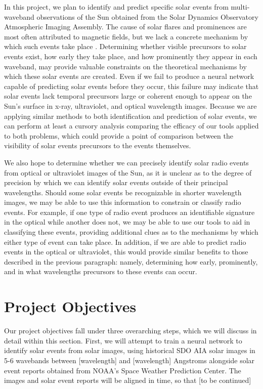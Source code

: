 \documentclass[12pt, letterpaper]{article}
\begin{document}
In this project, we plan to identify and predict specific solar events from multi-waveband observations of the Sun obtained from the Solar Dynamics Observatory Atmospheric Imaging Assembly. The cause of solar flares and prominences are most often attributed to magnetic fields, but we lack a concrete mechanism by which such events take place \cite{BOB}. Determining whether visible precursors to solar events exist, how early they take place, and how prominently they appear in each waveband, may provide valuable constraints on the theoretical mechanisms by which these solar events are created. Even if we fail to produce a neural network capable of predicting solar events before they occur, this failure may indicate that solar events lack temporal precursors large or coherent enough to appear on the Sun’s surface in x-ray, ultraviolet, and optical wavelength images. Because we are applying similar methods to both identification and prediction of solar events, we can perform at least a cursory analysis comparing the efficacy of our tools applied to both problems, which could provide a point of comparison between the visibility of solar events precursors to the events themselves. 

We also hope to determine whether we can precisely identify solar radio events from optical or ultraviolet images of the Sun, as it is unclear as to the degree of precision by which we can identify solar events outside of their principal wavelengths. Should some solar events be recognizable in shorter wavelength images, we may be able to use this information to constrain or classify radio events. For example, if one type of radio event produces an identifiable signature in the optical while another does not, we may be able to use our tools to aid in classifying these events, providing additional clues as to the mechanisms by which either type of event can take place. In addition, if we are able to predict radio events in the optical or ultraviolet, this would provide similar benefits to those described in the previous paragraph: namely, determining how early, prominently, and in what wavelengths precursors to these events can occur. 

\section*{Project Objectives}

Our project objectives fall under three overarching steps, which we will discuss in detail within this section. First, we will attempt to train a neural network to identify solar events from solar images, using historical SDO AIA solar images in 5-6 wavebands between [wavelength] and [wavelength] Angstroms alongside solar event reports obtained from NOAA’s Space Weather Prediction Center. The images and solar event reports will be aligned in time, so that [to be continued]
\end{document}
